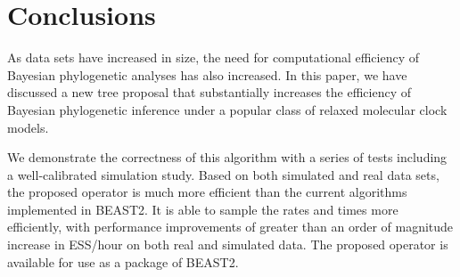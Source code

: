 \documentclass{bmcart}
\begin{document}
\section*{Conclusions}
As data sets have increased in size, the need for computational efficiency of Bayesian phylogenetic analyses has also increased. In this paper, we have discussed a new tree proposal that substantially increases the efficiency of Bayesian phylogenetic inference under a popular class of relaxed molecular clock models.

We demonstrate the correctness of this algorithm with a series of tests including a well-calibrated simulation study. Based on both simulated and real data sets, the proposed operator is much more efficient than the current algorithms implemented in BEAST2. It is able to sample the rates and times more efficiently, with performance improvements of greater than an order of magnitude increase in ESS/hour on both real and simulated data. The proposed operator is available for use as a package of BEAST2.
\end{document}
